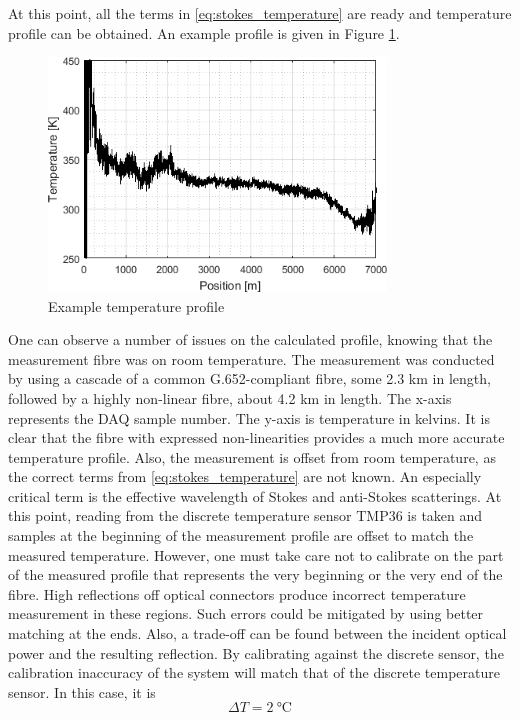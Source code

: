 \documentclass{standalone}
\begin{document}
At this point, all the terms in \ref{eq:stokes_temperature} are ready and temperature profile can be obtained. An example profile is given in Figure \ref{fig:temperature_example}.
\begin{figure}[h]
	\centering
	\includegraphics[width=0.8\textwidth]{temperature_example.png}
	\caption{Example temperature profile}
	\label{fig:temperature_example}
\end{figure}
One can observe a number of issues on the calculated profile, knowing that the measurement fibre was on room temperature. The measurement was conducted by using a cascade of a common G.652-compliant fibre, some 2.3 km in length, followed by a highly non-linear fibre, about 4.2 km in length. The x-axis represents the DAQ sample number. The y-axis is temperature in kelvins. It is clear that the fibre with expressed non-linearities provides a much more accurate temperature profile. Also, the measurement is offset from room temperature, as the correct terms from \ref{eq:stokes_temperature} are not known. An especially critical term is the effective wavelength of Stokes and anti-Stokes scatterings. At this point, reading from the discrete temperature sensor TMP36 is taken and samples at the beginning of the measurement profile are offset to match the measured temperature. However, one must take care not to calibrate on the part of the measured profile that represents the very beginning or the very end of the fibre. High reflections off optical connectors produce incorrect temperature measurement in these regions. Such errors could be mitigated by using better matching at the ends. Also, a trade-off can be found between the incident optical power and the resulting reflection. By calibrating against the discrete sensor, the calibration inaccuracy of the system will match that of the discrete temperature sensor. In this case, it is \cite{datasheet:tmp36}
\begin{equation}
\varDelta T = \SI{2}{\celsius}
\end{equation} \\
\end{document}
